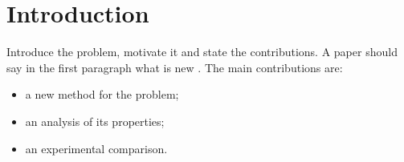 \section{Introduction}
Introduce the problem, motivate it and state the contributions. A paper should say in the first
paragraph what is new \cite{lamport1994}. The main contributions are:
\begin{itemize}
  \item a new method for the problem;
  \item an analysis of its properties;
  \item an experimental comparison.
\end{itemize}
